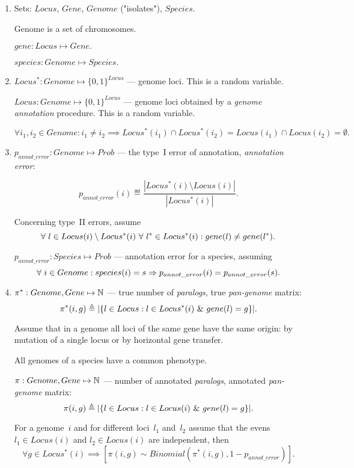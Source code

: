 \documentclass[10pt,a4paper]{article}
\theoremstyle{plain} \newtheorem{Lem}{Lemma}
\begin{document}
\begin{enumerate}

\item
Sets: $Locus$, $Gene$, $Genome$ ("isolates"), $Species$.

Genome is a set of chromosomes.

$ gene: Locus \mapsto Gene. $

$ species: Genome \mapsto Species. $


\item
$ Locus^*: Genome \mapsto \{0,1\}^{Locus}$ --- genome loci.
This is a random variable.

$ Locus: Genome \mapsto \{0,1\}^{Locus}$ --- genome loci obtained by a {\em genome annotation} procedure.
This is a random variable.

$$ \forall i_1, i_2 \in Genome : i_1 \ne i_2 \implies Locus^*(i_1) \cap Locus^*(i_2) = Locus(i_1) \cap Locus(i_2) = \emptyset. $$


\item
$p_{annot\_error}: Genome \mapsto Prob$ --- the type~I error of annotation, {\em annotation error}:

$$ p_{annot\_error}(i) \eqdef \frac{|Locus^*(i) \setminus Locus(i)|} {|Locus^*(i)|}. $$

Concerning type~II errors, assume
$$   \forall \  l \in Locus(i) \setminus Locus^*(i) 
   \ \forall \  l^* \in Locus^*(i)
   : gene(l) \ne gene(l^*)
   .
$$

$p_{annot\_error}: Species \mapsto Prob$ --- annotation error for a species, assuming
$$ \forall \  i \in Genome: species(i) = s \Rightarrow p_{annot\_error}(i) = p_{annot\_error}(s). $$

\item
$\pi^*: Genome, Gene \mapsto \mathbb N$ --- true number of {\em paralogs}, true {\em pan-genome} matrix:
$$\pi^* (i,g) \triangleq |\{l \in Locus: l \in Locus^*(i) \ \& \  gene(l) = g\}|. $$

Assume that in a genome all loci of the same gene have the same origin: by mutation of a single locus or by horizontal gene transfer.

All genomes of a species have a common phenotype.


$\pi: Genome, Gene \mapsto \mathbb N$ --- number of annotated {\em paralogs}, annotated {\em pan-genome} matrix:
$$\pi (i,g) \triangleq |\{l \in Locus: l \in Locus(i) \ \& \  gene(l) = g\}|. $$


For a genome~$i$ and for different loci~$l_1$ and~$l_2$ assume 
that the evens $l_1 \in Locus(i)$ and $l_2 \in Locus(i)$ are independent,
then
$$ \forall g \in Locus^*(i) \implies [\pi(i,g) \sim Binomial(\pi^*(i,g), 1 - p_{annot\_error})]. $$



\end{enumerate}
\end{document}
